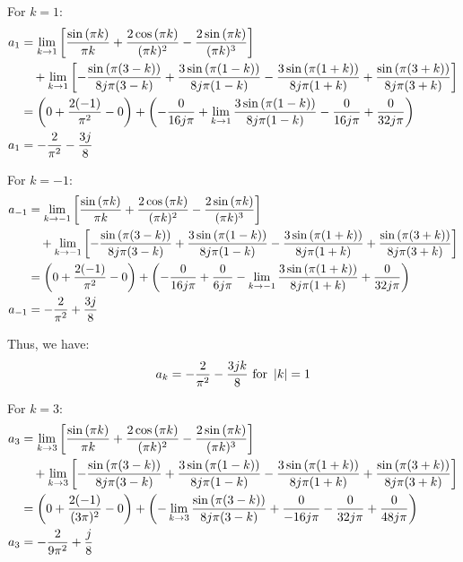\documentclass[a4paper, 10pt]{article}
\begin{document}
\begin{tosubmit}
\vspace{5mm}

For \( k = 1 \):
\begin{align*}
    a_1 &= \lim_{k \to 1} \left[ \frac{\sin{(\pi k)}}{\pi k} + \frac{2 \cos{(\pi k)}}{(\pi k)^2} - \frac {2 \sin{(\pi k)}}{(\pi k)^3} \right] \\
    &\quad + \lim_{k \to 1} \left[ -\frac{\sin{(\pi (3 - k))}}{8j\pi (3 - k)} + \frac{3 \sin{(\pi (1 - k))}}{8j\pi (1 - k)} - \frac{3 \sin{(\pi (1 + k))}}{8j\pi (1 + k)} + \frac{\sin{(\pi (3 + k))}}{8j\pi (3 + k)} \right] \\
    &= \left( 0 + \frac{2(-1)}{\pi^2} - 0 \right) + \left( -\frac{0}{16j\pi} + \lim_{k \to 1} \frac{3 \sin{(\pi (1 - k))}}{8j\pi (1 - k)} - \frac{0}{16j\pi} + \frac{0}{32j\pi} \right) \\
    a_1 &= -\frac{2}{\pi^2} - \frac{3j}{8}
\end{align*}

For \( k = -1 \):
\begin{align*}
    a_{-1} &= \lim_{k \to -1} \left[ \frac{\sin{(\pi k)}}{\pi k} + \frac{2 \cos{(\pi k)}}{(\pi k)^2} - \frac {2 \sin{(\pi k)}}{(\pi k)^3} \right] \\
    &\quad + \lim_{k \to -1} \left[ -\frac{\sin{(\pi (3 - k))}}{8j\pi (3 - k)} + \frac{3 \sin{(\pi (1 - k))}}{8j\pi (1 - k)} - \frac{3 \sin{(\pi (1 + k))}}{8j\pi (1 + k)} + \frac{\sin{(\pi (3 + k))}}{8j\pi (3 + k)} \right] \\
    &= \left( 0 + \frac{2(-1)}{\pi^2} - 0 \right) + \left( -\frac{0}{16j\pi} + \frac{0}{6j\pi} - \lim_{k \to -1} \frac{3 \sin{(\pi (1 + k))}}{8j\pi (1 + k)} + \frac{0}{32j\pi} \right) \\
    a_{-1} &= -\frac{2}{\pi^2} + \frac{3j}{8}
\end{align*}

\newpage

Thus, we have:
\[ a_k = -\frac{2}{\pi^2} - \frac{3jk}{8} \text{ for } \left| k \right| = 1 \]

\vspace{5mm}

For \( k = 3 \):
\begin{align*}
    a_3 &= \lim_{k \to 3} \left[ \frac{\sin{(\pi k)}}{\pi k} + \frac{2 \cos{(\pi k)}}{(\pi k)^2} - \frac {2 \sin{(\pi k)}}{(\pi k)^3} \right] \\
    &\quad + \lim_{k \to 3} \left[ -\frac{\sin{(\pi (3 - k))}}{8j\pi (3 - k)} + \frac{3 \sin{(\pi (1 - k))}}{8j\pi (1 - k)} - \frac{3 \sin{(\pi (1 + k))}}{8j\pi (1 + k)} + \frac{\sin{(\pi (3 + k))}}{8j\pi (3 + k)} \right] \\
    &= \left( 0 + \frac{2(-1)}{(3\pi)^2} - 0 \right) + \left( -\lim_{k \to 3} \frac{\sin{(\pi (3 - k))}}{8j\pi (3 - k)} + \frac{0}{-16j\pi} - \frac{0}{32j\pi} + \frac{0}{48j\pi} \right) \\
    a_3 &= -\frac{2}{9\pi^2} + \frac{j}{8}
\end{align*}


\end{tosubmit}
\end{document}
